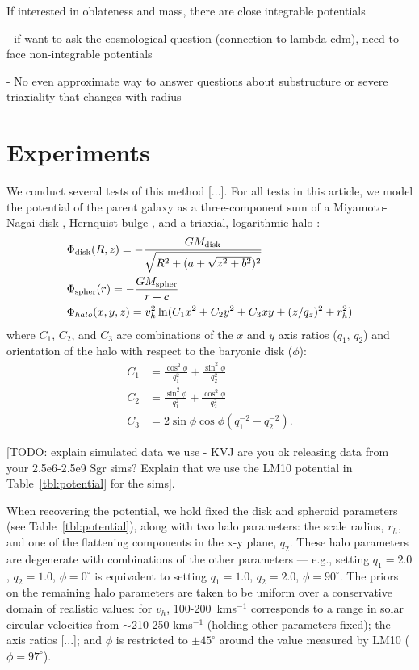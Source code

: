 \documentclass[letterpaper,12pt,preprint]{aastex}
\begin{document}
If interested in oblateness and mass, there are close integrable potentials

- if want to ask the cosmological question (connection to lambda-cdm), need to face non-integrable potentials

- No even approximate way to answer questions about substructure or severe triaxiality that changes with radius


\section{Experiments}
We conduct several tests of this method [...]. For all tests in this article, we model the potential of the parent galaxy as a three-component sum of a Miyamoto-Nagai disk \citep{}, Hernquist bulge \citep[spheroid][]{}, and a triaxial, logarithmic halo \citep[e.g.,][]{law10}:
\begin{align}
	&\Phi_{\rm disk}(R,z) = -\frac{GM_{\rm disk}}{\sqrt{R^2 + (a + \sqrt{z^2 + b^2})^2}}\\
	&\Phi_{\rm spher}(r) = -\frac{GM_{\rm spher}}{r + c}\\
	&\Phi_{halo}(x,y,z) = v_{h}^2 \ln(C_1 x^2 + C_2 y^2 + C_3 xy + (z/q_z)^2 + r_h^2)
\end{align}
where $C_1$, $C_2$, and $C_3$ are combinations of the $x$ and $y$ axis
ratios ($q_1$, $q_2$) and orientation of the halo with respect to the
baryonic disk ($\phi$):
\begin{align}
  C_1 &= \frac{\cos^2\phi}{q_1^2} + \frac{\sin^2\phi}{q_2^2}\\
  C_2 &= \frac{\sin^2\phi}{q_1^2} + \frac{\cos^2\phi}{q_2^2}\\
  C_3 &= 2\sin\phi\cos\phi \left(q_1^{-2} - q_2^{-2}\right).
\end{align}

[TODO: explain simulated data we use - KVJ are you ok releasing data from your 2.5e6-2.5e9 Sgr sims? Explain that we use the LM10 potential in Table~\ref{tbl:potential} for the sims]. 

When recovering the potential, we hold fixed the disk and spheroid parameters (see Table~\ref{tbl:potential}), along with two halo parameters: the scale radius, $r_h$, and one of the flattening components in the x-y plane, $q_2$. These halo parameters are degenerate with combinations of the other parameters --- e.g., setting $q_1=2.0$, $q_2=1.0$, $\phi=0^\circ$ is equivalent to setting $q_1=1.0$, $q_2=2.0$, $\phi=90^\circ$. The priors on the remaining halo parameters are taken to be uniform over a conservative domain of realistic values: for $v_h$, 100-200~kms$^{-1}$ corresponds to a range in solar circular velocities from $\sim$210-250 kms$^{-1}$ (holding other parameters fixed); the axis ratios [...]; and $\phi$ is restricted to $\pm45^\circ$ around the value measured by LM10 ($\phi = 97^\circ$).
\end{document}
